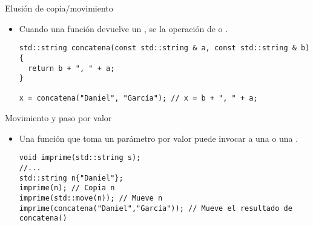 \begin{frame}[t,fragile]{Elusión de copia/movimiento}
\begin{itemize}
  \item Cuando una función devuelve un ,
        se  la operación de  o . 
\begin{lstlisting}
std::string concatena(const std::string & a, const std::string & b) {
  return b + ", " + a;
}

x = concatena("Daniel", "García"); // x = b + ", " + a;
\end{lstlisting}

\end{itemize}
\end{frame}

\begin{frame}[t,fragile]{Movimiento y paso por valor}
\begin{itemize}
  \item Una función que toma un parámetro por valor puede invocar
        a una  o una .
\begin{lstlisting}
void imprime(std::string s);
//...
std::string n{"Daniel"};
imprime(n); // Copia n
imprime(std::move(n)); // Mueve n
imprime(concatena("Daniel","García")); // Mueve el resultado de concatena()
\end{lstlisting}
\end{itemize}
\end{frame}
